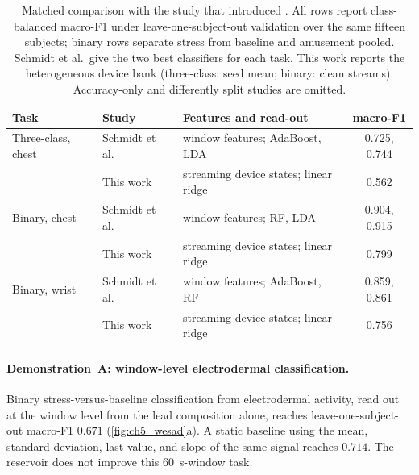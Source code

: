 \documentclass[12pt, twoside]{report}
\begin{document}
\begin{table}[t]
  \centering
  \small
  \caption[Matched WESAD literature comparison]{Matched comparison with the study that introduced \WESAD{}. All rows report class-balanced macro-F1 under leave-one-subject-out validation over the same fifteen subjects; binary rows separate stress from baseline and amusement pooled. Schmidt et al.\ give the two best classifiers for each task. This work reports the heterogeneous device bank (three-class: seed mean; binary: clean streams). Accuracy-only and differently split studies are omitted.}
  \label{tab:ch5_sota}
  \setlength{\tabcolsep}{3pt}
  \begin{tabularx}{\linewidth}{@{}>{\raggedright\arraybackslash}p{2.9cm}>{\raggedright\arraybackslash}p{2.5cm}>{\raggedright\arraybackslash}Xc@{}}
    \toprule
    Task & Study & Features and read-out & macro-F1 \\
    \midrule
    Three-class, chest & Schmidt et al.~\cite{Schmidt2018WESAD} & window features; AdaBoost, LDA & 0.725, 0.744 \\
                       & This work & streaming device states; linear ridge & 0.562 \\
    Binary, chest      & Schmidt et al.~\cite{Schmidt2018WESAD} & window features; RF, LDA & 0.904, 0.915 \\
                       & This work & streaming device states; linear ridge & 0.799 \\
    Binary, wrist      & Schmidt et al.~\cite{Schmidt2018WESAD} & window features; AdaBoost, RF & 0.859, 0.861 \\
                       & This work & streaming device states; linear ridge & 0.756 \\
    \bottomrule
  \end{tabularx}
\end{table}

\paragraph{Demonstration~A: window-level electrodermal classification.} Binary stress-versus-baseline classification from electrodermal activity, read out at the window level from the lead composition alone, reaches leave-one-subject-out macro-F1 $0.671$ (\cref{fig:ch5_wesad}a). A static baseline using the mean, standard deviation, last value, and slope of the same signal reaches $0.714$. The reservoir does not improve this \SI{60}{\second}-window task.
\end{document}
